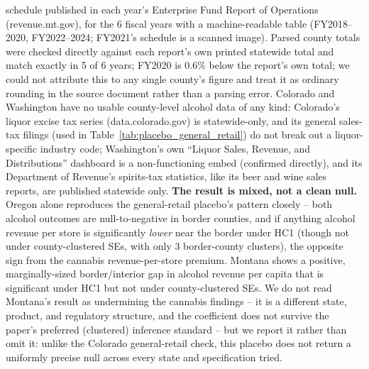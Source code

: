 \begin{table}[htbp]
\begin{minipage}{0.95\textwidth}
schedule published in each year's Enterprise Fund Report of Operations (revenue.mt.gov), for the 6 fiscal
years with a machine-readable table (FY2018--2020, FY2022--2024; FY2021's schedule is a scanned image).
Parsed county totals were checked directly against each report's own printed statewide total and match
exactly in 5 of 6 years; FY2020 is 0.6\% below the report's own total; we could not attribute this to any
single county's figure and treat it as ordinary rounding in the source document rather than a parsing
error. Colorado and Washington have no usable county-level alcohol data of any kind: Colorado's liquor
excise tax series (data.colorado.gov) is statewide-only, and its general sales-tax filings (used in
Table~\ref{tab:placebo_general_retail}) do not break out a liquor-specific industry code; Washington's own
``Liquor Sales, Revenue, and Distributions'' dashboard is a non-functioning embed (confirmed directly), and
its Department of Revenue's spirits-tax statistics, like its beer and wine sales reports, are published
statewide only. \textbf{The result is mixed, not a clean null.} Oregon alone reproduces the general-retail
placebo's pattern closely -- both alcohol outcomes are null-to-negative in border counties, and if anything
alcohol revenue per store is significantly \emph{lower} near the border under HC1 (though not under
county-clustered SEs, with only 3 border-county clusters), the opposite sign from the cannabis
revenue-per-store premium. Montana shows a positive, marginally-sized border/interior gap in alcohol
revenue per capita that is significant under HC1 but not under county-clustered SEs. We do not read
Montana's result as undermining the cannabis findings -- it is a different state, product, and regulatory
structure, and the coefficient does not survive the paper's preferred (clustered) inference standard -- but
we report it rather than omit it: unlike the Colorado general-retail check, this placebo does not return a
uniformly precise null across every state and specification tried.
\end{minipage}
\end{table}

